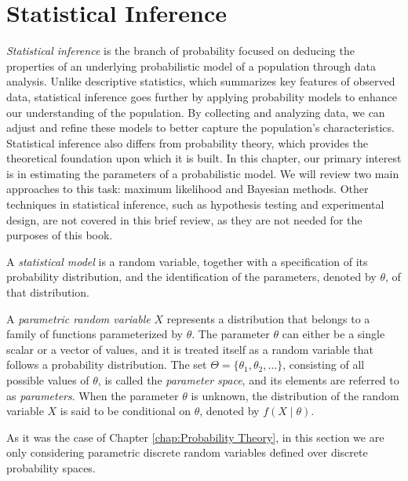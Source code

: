 %
%

\section{Statistical Inference}
 
\emph{Statistical inference} is the branch of probability focused on deducing the properties of an underlying probabilistic model of a population through data analysis. Unlike descriptive statistics, which summarizes key features of observed data, statistical inference goes further by applying probability models to enhance our understanding of the population. By collecting and analyzing data, we can adjust and refine these models to better capture the population's characteristics. Statistical inference also differs from probability theory, which provides the theoretical foundation upon which it is built. In this chapter, our primary interest is in estimating the parameters of a probabilistic model. We will review two main approaches to this task: maximum likelihood and Bayesian methods. Other techniques in statistical inference, such as hypothesis testing and experimental design, are not covered in this brief review, as they are not needed for the purposes of this book.

\begin{definition}
A \emph{statistical model} is a random variable, together with a specification of its probability distribution, and the identification of the parameters, denoted by $\theta$, of that distribution. 
\end{definition}

A \emph{parametric random variable} $X$ represents a distribution that belongs to a family of functions parameterized by $\theta$. The parameter $\theta$ can either be a single scalar or a vector of values, and it is treated itself as a random variable that follows a probability distribution. The set $\Theta = \{ \theta_1, \theta_2, \ldots \}$, consisting of all possible values of $\theta$, is called the \emph{parameter space}, and its elements are referred to as \emph{parameters}. When the parameter $\theta$ is unknown, the distribution of the random variable $X$ is said to be conditional on $\theta$, denoted by $f\left(X \mid \theta \right)$.

As it was the case of Chapter \ref{chap:Probability Theory}, in this section we are only considering parametric discrete random variables defined over discrete probability spaces.

